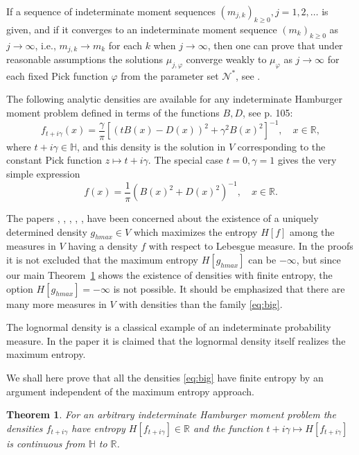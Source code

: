 \documentclass [12pt]{article}
\newtheorem{thm}{Theorem}[section]
\newcommand{\R}{\mathbb{R}}
\renewcommand{\H}{\mathbb{H}}
\begin{document}
If a sequence of indeterminate moment sequences $(m_{j,k})_{k\ge 0}, j=1,2,\ldots$ is given, and if it converges to an indeterminate moment sequence $(m_k)_{k\ge 0}$ as $j\to \infty$, i.e.,
$m_{j,k}\to m_k$ for each $k$ when $j\to\infty$, then one can prove that under reasonable assumptions  the solutions $\mu_{j,\varphi}$ converge weakly to $\mu_\varphi$ as $j\to\infty$ for each fixed Pick function $\varphi$ from the parameter set $\mathcal N^*$, see \cite[Proposition 2.4.1]{B:V}.


The following analytic densities are available for any indeterminate Hamburger moment problem defined in terms of the functions $B, D$, see \cite{B:C} p. 105:
\begin{equation}\label{eq:big}
f_{t+i\gamma}(x)=\frac{\gamma}{\pi}\left[(tB(x)-D(x))^2+\gamma^2 B(x)^2\right]^{-1}, \quad x\in \R,
\end{equation}
where $t+i\gamma\in \H$, and this density is the solution in $V$ corresponding to the constant Pick function $z\mapsto t+i\gamma$. The special case $t=0,\gamma=1$ gives the very simple expression
\begin{equation}\label{eq:i}
f(x)=\frac{1}{\pi}\left( B(x)^2+ D(x)^2\right)^{-1},\quad x\in\R.  
\end{equation}

The papers \cite{M:T}, \cite{N:T1}, \cite{N:T2}, \cite{N:T3}, \cite{N:T4}, \cite{S:T:N} have been concerned about the existence of a uniquely determined density $g_{hmax}\in V$ which maximizes  the entropy $H[f]$ among the measures in $V$ having a density $f$ with respect to Lebesgue measure. In the proofs it is not excluded that the maximum entropy $H[g_{hmax}]$ can be $-\infty$, but since our main Theorem~\ref{thm:main} shows the existence of densities with finite entropy, the option 
$H[g_{hmax}]=-\infty$ is not possible. It should be emphasized that there are many more
measures in $V$ with densities than the family \eqref{eq:big}.

The lognormal density is a classical example of an indeterminate probability measure. In the paper \cite{N:T3} it is claimed that the lognormal density itself realizes the maximum entropy.


We shall here prove that all the densities \eqref{eq:big} have  finite entropy by an argument independent of the maximum entropy approach. 

\begin{thm}\label{thm:main} For an arbitrary indeterminate Hamburger moment problem
the densities $f_{t+i\gamma}$ have entropy $H[f_{t+i\gamma}]\in\R$ and the function
$t+i\gamma\mapsto H[f_{t+i\gamma}]$ is continuous from $\H$ to $\R$.
\end{thm} 
 
\end{document}
